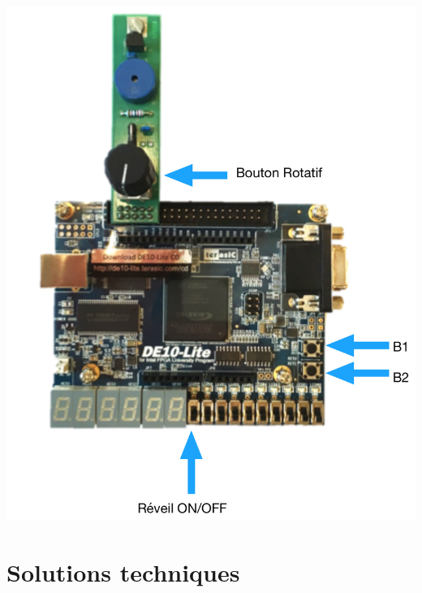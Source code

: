 \documentclass[a4paper, 11pt]{article}
\begin{document}
\begin{minipage}{0.4\textwidth}
\includegraphics[scale=0.4]{figures/de10label.png}
\end{minipage}
\newpage
\section{Solutions techniques}
\end{document}
